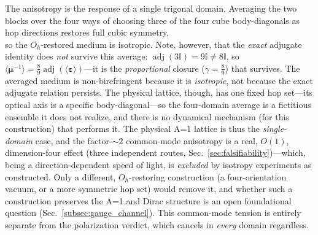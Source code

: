 \begin{remark}
\label{rem:oh_restoration}
The anisotropy is the response of a single trigonal domain. Averaging the two blocks
over the four ways of choosing three of the four cube body-diagonals as hop
directions restores full cubic symmetry,
\begin{equation}
    \label{eq:oh_average}
    
\end{equation}
so the $O_h$-restored medium is isotropic. Note, however, that the \emph{exact}
adjugate identity does \emph{not} survive this average: $\operatorname{adj}(3\mathbb{I})
= 9\mathbb{I} \neq 8\mathbb{I}$, so $\langle\boldsymbol{\mu}^{-1}\rangle =
\tfrac89\operatorname{adj}(\langle\boldsymbol{\varepsilon}\rangle)$---it is the
\emph{proportional} closure ($\gamma=\tfrac89$) that survives. The averaged medium is
non-birefringent because it is \emph{isotropic}, not because the exact adjugate
relation persists. The physical lattice, though, has one fixed hop set---its optical
axis is a specific body-diagonal---so the four-domain average is a fictitious ensemble
it does not realize, and there is no dynamical mechanism (for this construction) that
performs it. The physical A=1 lattice is thus the \emph{single-domain} case, and the
factor-$\sim2$ common-mode anisotropy is a real, $O(1)$, dimension-four effect (three
independent routes, Sec.~\ref{sec:falsifiability})---which, being a direction-dependent
speed of light, is \emph{excluded} by isotropy experiments as constructed. Only a
different, $O_h$-restoring construction (a four-orientation vacuum, or a more symmetric
hop set) would remove it, and whether such a construction preserves the A=1 and Dirac
structure is an open foundational question (Sec.~\ref{subsec:gauge_channel}). This
common-mode tension is entirely separate from the polarization verdict, which cancels in
\emph{every} domain regardless.
\end{remark}

